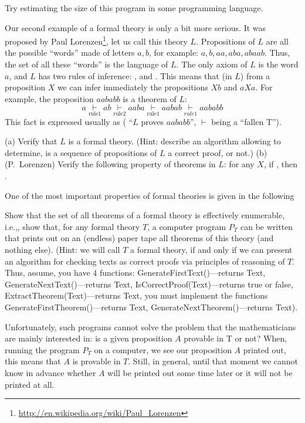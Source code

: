 \begin{exercise}
Try estimating the size of this program in some programming language.
\end{exercise}

Our second example of a formal theory is only a bit more serious.
It was proposed by Paul Lorenzen\footnote{\url{http://en.wikipedia.org/wiki/Paul\_Lorenzen}}, let us call this theory \(L\).
Propositions of \(L\) are all the possible ``words'' made of letters \(a, b\), for example: \(a, b, aa, aba, abaab\).
Thus, the set of all these ``words'' is the language of \(L\).
The only axiom of \(L\) is the word \(a\), and \(L\) has two rules of inference: , and .
This means that (in \(L\)) from a proposition \(X\) we can infer immediately the propositions \(Xb\) and \(aXa\).
For example, the proposition \(aababb\) is a theorem of \(L\):
\[
a \underset{\text{rule1}}{\vdash} ab \underset{\text{rule2}}{\vdash} aaba \underset{\text{rule1}}{\vdash} aabab \underset{rule1}{\vdash} aababb
\]
This fact is expressed usually as  ( ``\(L\) proves \(aababb\)'', \(\vdash\) being a ``fallen T'').

\begin{exercise}
(a) Verify that \(L\) is a formal theory.
(Hint: describe an algorithm allowing to determine, is a sequence of propositions of \(L\) a correct proof, or not.)
(b) (P.~Lorenzen) Verify the following property of theorems in \(L\): for any \(X\), if , then .
\end{exercise}

One of the most important properties of formal theories is given in the following

\begin{exercise}
Show that the set of all theorems of a formal theory is effectively enumerable, i.e.,, show that, for any formal theory \(T\), a computer program \(P_T\) can be written that prints out on an (endless) paper tape all theorems of this theory (and nothing else).
(Hint: we will call \(T\) a formal theory, if and only if we can present an algorithm for checking texts as correct proofs via principles of reasoning of \(T\).
Thus, assume, you have 4 functions: GenerateFirstText()---returns Text, GenerateNextText()---returns Text, IsCorrectProof(Text)---returns true or false, ExtractTheorem(Text)---returns Text, you must implement the functions GenerateFirstTheorem()---returns Text, GenerateNextTheorem()---returns Text).

Unfortunately, such programs cannot solve the problem that the mathematicians are mainly interested in: is a given proposition \(A\) provable in T or not? When, running the program \(P_T\) on a computer, we see our proposition \(A\) printed out, this means that \(A\) is provable in \(T\).
Still, in general, until that moment we cannot know in advance whether \(A\) will be printed out some time later or it will not be printed at all.
\end{exercise}

